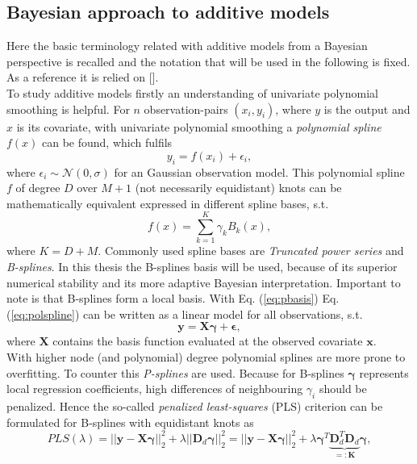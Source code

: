 \documentclass[12pt,letterpaper]{article}
\begin{document}
\subsection{Bayesian approach to additive models}
Here the basic terminology related with additive models from a Bayesian perspective is recalled and the notation that will be used in the following is fixed. As a reference it is relied on [\cite{bayessm}]. \\
To study additive models firstly an understanding of univariate polynomial smoothing is helpful. For $n$ observation-pairs $(x_i, y_i)$, where $y$ is the output and $x$ is its covariate, with univariate polynomial smoothing a \textit{polynomial spline} $f(x)$ can be found, which fulfils 
\begin{equation}
y_i = f(x_i) + \epsilon_i,
\label{eq:polspline}
\end{equation}
where $\epsilon_i \sim \mathcal{N}(0,\sigma)$ for an Gaussian observation model. This polynomial spline $f$ of degree $D$ over $M+1$ (not necessarily equidistant) knots can be mathematically equivalent expressed in different spline bases, s.t.  
\begin{equation}
f(x) = \sum^K_{k=1}\gamma_k B_k(x),
\label{eq:pbasis}
\end{equation}
where $K = D + M.$
Commonly used spline bases are \textit{Truncated power series} and \textit{B-splines}. In this thesis the B-splines basis will be used, because of its superior numerical stability and its more adaptive Bayesian interpretation. Important to note is that B-splines form a local basis. With Eq. (\ref{eq:pbasis}) Eq. (\ref{eq:polspline}) can be written as a linear model for all observations, s.t.
\begin{equation}
\mathbf{y} = \mathbf{X} \mathbf{ \gamma } + \mathbf{\epsilon},
\end{equation}
where $\mathbf{X}$ contains the basis function evaluated at the observed covariate $\mathbf{x}$. \\
With higher node (and polynomial) degree polynomial splines are more prone to overfitting. To counter this \textit{P-splines} are used. Because for B-splines $\mathbf{\gamma}$ represents local regression coefficients, high differences of neighbouring $\gamma_i$ should be penalized. Hence the so-called \textit{penalized least-squares} (PLS) criterion can be formulated for B-splines with equidistant knots as
\begin{equation}
PLS(\lambda) = ||\mathbf{y} - \mathbf{X}\mathbf{\gamma}||^2_2 +
 \lambda||\mathbf{D}_d\mathbf{\gamma}||^2_2 = ||\mathbf{y} - \mathbf{X}\mathbf{\gamma}||^2_2 +  \lambda\mathbf{\gamma}^T\underbrace{\mathbf{D}_d^T\mathbf{D}_d}_{=:\mathbf{K}}\mathbf{\gamma},
\end{equation}
\end{document}
